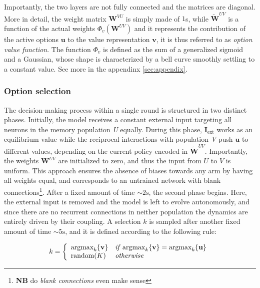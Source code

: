 \noindent Importantly, the two layers are not fully connected and the matrices are diagonal.
More in detail, the weight matrix $\textbf{W}^{VU}$ is simply made of $1$s, while $\tilde{\textbf{W}}^{UV}$ is a function of the actual weights $\Phi_{v}(\textbf{W}^{UV})$ and it represents the contribution of the
active options $\textbf{u}$ to the value representation $\textbf{v}$, it is thus referred to as \textit{option value function}.
The function $\Phi_{v}$ is defined as the sum of a generalized sigmoid and a Gaussian, whose shape is characterized by a bell curve smoothly settling to a constant value. See more in the appendinx \ref{sec:appendix}.

\subsubsection{Option selection}
The decision-making process within a single round is structured in two distinct phases. Initially, the model receives a constant external input targeting all neurons in the memory population \textit{U} equally.
During this phase, $\textbf{I}_{\text{ext}}$ works as an equilibrium value while the reciprocal interactions with population \textit{V} push $\textbf{u}$ to different values, depending on the current policy encoded in $\tilde{\textbf{W}}^{UV}$.
Importantly, the weights $\textbf{W}^{UV}$ are initialized to zero, and thus the input from $U$ to $V$ is uniform. This approach ensures the absence of biases towards any arm by having all weights equal, and corresponds to an untrained network with blank connections\footnote{\textbf{NB} do \textit{blank connections} even make sense}.
After a fixed amount of time $\sim 2 \text{s}$, the second phase begins. Here, the external input is removed and the model is left to evolve autonomously, and since there are no recurrent connections in neither population the dynamics are entirely driven by their coupling.
A selection $k$ is sampled after another fixed amount of time $\sim 5 \text{s}$, and it is defined according to the following rule:

\begin{equation*}
    k =
    \left\{
        \begin{array}{ll}
            \text{argmax}_{k}\{\textbf{v}\} & \text{\textit{if}}\; \text{argmax}_{k} \{\textbf{v}\} = \text{argmax}_{k} \{\textbf{u}\} \\
            \text{random}(K) & \text{\textit{otherwise}}
        \end{array}
    \right.
\end{equation*}

